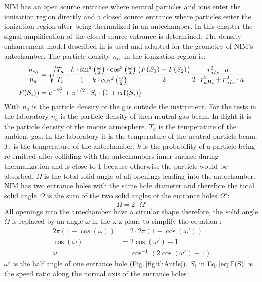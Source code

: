 	NIM has an open source entrance where neutral particles and ions enter the ionisation region directly and a closed source entrance where particles enter the ionization region after being thermalized in an antechamber. In this chapter the signal amplification of the closed source entrance is determined. The density enhancement model described in \cite{DensEnhan_Wurz_07} is used and adapted for the geometry of NIM's antechamber. The particle density $n_{cs}$ in the ionization region is:
	\begin{align}
		\frac{n_{cs}}{n_a} &= \sqrt{\frac{T_a}{T_s}}\cdot\frac{k\cdot \sin^2\big(\frac{\omega}{2}\big)\cdot \cos^2\big(\frac{\omega}{2}\big)}{1-k\cdot \cos^2\big(\frac{\omega}{2}\big)}\frac{\big(F(S_1)+ F(S_2)\big)}{2} \frac{r_{aIs}^2\cdot a}{2\cdot r_{aHi}^2 + r_{aIs}^2\cdot a} \label{eq:thDensEnhan}\\
		F(S_i)) &= e^{-S_i^2} + \pi^{1/2}\cdot S_i\cdot\big(1 + {\rm erf}(S_i)\big) \label{eq:F(S)}
	\end{align}
	With $n_a$ is the particle density of the gas outside the instrument. For the tests in the laboratory $n_a$ is the particle density of then neutral gas beam. In flight it is the particle density of the moons atmosphere. $T_a$ is the temperature of the ambient gas. In the laboratory it is the temperature of the neutral particle beam. $T_s$ is the temperature of the antechamber. $k$ is the probability of a particle being re-emitted after colliding with the antechambers inner surface during thermalization and is close to 1 because otherwise the particle would be absorbed. $\Omega$ is the total solid angle of all openings leading into the antechamber. NIM has two entrance holes with the same hole diameter and therefore the total solid angle $\Omega$ is the sum of the two solid angles of the entrance holes $\Omega'$:
	\begin{equation}
		\Omega = 2\cdot\Omega'
	\end{equation}
	All openings into the antechamber have a circular shape therefore, the solid angle $\Omega$ is replaced by an angle $\omega$ in the x-z-plane to simplify the equation \cite{Hedin_1964}: 
	\begin{align}
		2\pi(1- \cos(\omega)) &= 2\cdot 2\pi(1- \cos(\omega'))\\
		\cos(\omega) &= 2\cos(\omega') -1\\
		\omega &= \cos^{-1}(2\cos(\omega') -1)
	\end{align}
	$\omega'$ is the half angle of one entrance hole (Fig.\,\ref{fig:thAntIs}). $S_i$ in Eq.\,\eqref{eq:F(S)} is the speed ratio along the normal axis of the entrance holes:
